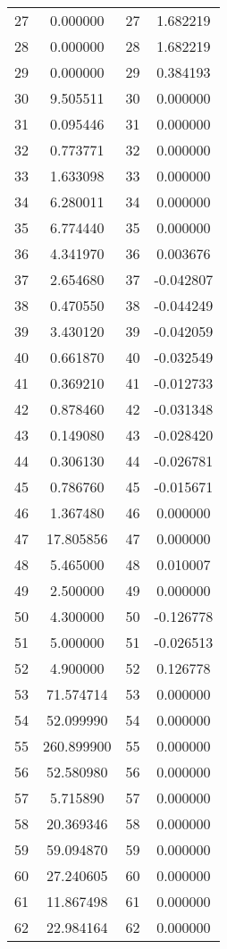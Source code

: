 \documentclass[12pt]{article}
\begin{document}
\begin{longtable}{@{}cccc@{}}
27 & 0.000000 & 27 & 1.682219 \\
28 & 0.000000 & 28 & 1.682219 \\
29 & 0.000000 & 29 & 0.384193 \\
30 & 9.505511 & 30 & 0.000000 \\
31 & 0.095446 & 31 & 0.000000 \\
32 & 0.773771 & 32 & 0.000000 \\
33 & 1.633098 & 33 & 0.000000 \\
34 & 6.280011 & 34 & 0.000000 \\
35 & 6.774440 & 35 & 0.000000 \\
36 & 4.341970 & 36 & 0.003676 \\
37 & 2.654680 & 37 & -0.042807 \\
38 & 0.470550 & 38 & -0.044249 \\
39 & 3.430120 & 39 & -0.042059 \\
40 & 0.661870 & 40 & -0.032549 \\
41 & 0.369210 & 41 & -0.012733 \\
42 & 0.878460 & 42 & -0.031348 \\
43 & 0.149080 & 43 & -0.028420 \\
44 & 0.306130 & 44 & -0.026781 \\
45 & 0.786760 & 45 & -0.015671 \\
46 & 1.367480 & 46 & 0.000000 \\
47 & 17.805856 & 47 & 0.000000 \\
48 & 5.465000 & 48 & 0.010007 \\
49 & 2.500000 & 49 & 0.000000 \\
50 & 4.300000 & 50 & -0.126778 \\
51 & 5.000000 & 51 & -0.026513 \\
52 & 4.900000 & 52 & 0.126778 \\
53 & 71.574714 & 53 & 0.000000 \\
54 & 52.099990 & 54 & 0.000000 \\
55 & 260.899900 & 55 & 0.000000 \\
56 & 52.580980 & 56 & 0.000000 \\
57 & 5.715890 & 57 & 0.000000 \\
58 & 20.369346 & 58 & 0.000000 \\
59 & 59.094870 & 59 & 0.000000 \\
60 & 27.240605 & 60 & 0.000000 \\
61 & 11.867498 & 61 & 0.000000 \\
62 & 22.984164 & 62 & 0.000000 \\

\end{longtable}
\end{document}
